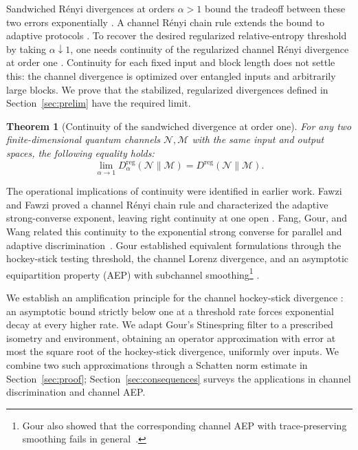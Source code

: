 \documentclass[11pt,letterpaper]{article}
\numberwithin{equation}{section}
\newtheorem{theorem}{Theorem}
\newcommand{\N}{\mathcal N}
\newcommand{\M}{\mathcal M}
\newcommand{\reg}{\mathrm{reg}}
\newcommand{\Dt}{D}
\begin{document}
Sandwiched R\'enyi divergences at orders $\alpha>1$ bound the tradeoff between these two errors exponentially \cite{MLDFT,WWY}. A channel R\'enyi chain rule extends the bound to adaptive protocols \cite{FF}. To recover the desired regularized relative-entropy threshold by taking $\alpha\downarrow1$, one needs continuity of the regularized channel R\'enyi divergence at order one \cite{FF,FGW}. Continuity for each fixed input and block length does not settle this: the channel divergence is optimized over entangled inputs and arbitrarily large blocks. We prove that the stabilized, regularized divergences defined in Section~\ref{sec:prelim} have the required limit.

\begin{theorem}[Continuity of the sandwiched divergence at order one]\label{thm:main}
For any two finite-dimensional quantum channels $\N,\M$ with the same input and output spaces, the following equality holds:
\begin{equation}\label{eq:main}
 \lim_{\alpha\to1}\Dt_\alpha^{\reg}(\N\|\M)
       =D^{\reg}(\N\|\M).
\end{equation}
\end{theorem}



The operational implications of continuity were identified in earlier work. Fawzi and Fawzi proved a channel R\'enyi chain rule and characterized the adaptive strong-converse exponent, leaving right continuity at one open \cite{FF}. Fang, Gour, and Wang related this continuity to the exponential strong converse for parallel and adaptive discrimination~\cite{FGW}. Gour established equivalent formulations through the hockey-stick testing threshold, the channel Lorenz divergence, and an asymptotic equipartition property (AEP) with subchannel smoothing\footnote{Gour also showed that the corresponding channel AEP with trace-preserving smoothing fails in general~\cite{Gour}.} \cite[Theorem 14]{Gour}.

We establish an amplification principle for the channel hockey-stick divergence \cite{Gour,SW}: an asymptotic bound strictly below one at a threshold rate forces exponential decay at every higher rate. We adapt Gour's Stinespring filter \cite{Gour} to a prescribed isometry and environment, obtaining an operator approximation with error at most the square root of the hockey-stick divergence, uniformly over inputs. We combine two such approximations through a Schatten norm estimate in Section~\ref{sec:proof}; Section~\ref{sec:consequences} surveys the applications in channel discrimination and channel AEP.
\end{document}
